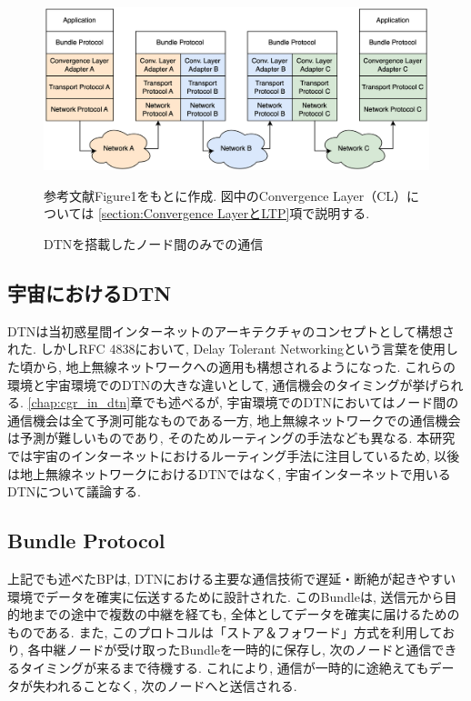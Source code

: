 
\begin{figure}[tbh]
    \centering
    \includegraphics[width=0.7\textheight]{img/dtnprotocolstack.pdf}
    \caption{DTNを搭載したノード間のみでの通信}
    \label{fig:dtnprotocolstack}
    \begin{minipage}{\textwidth}
        \raggedright
        \vspace{3mm}
        \fontsize{10.5pt}{12pt}\selectfont
        参考文献\cite{bundle_protocol_architecture}Figure1をもとに作成. 
        図中のConvergence Layer（CL）については
        \ref{section:Convergence LayerとLTP}項で説明する.
    \end{minipage}
\end{figure}

\subsection{宇宙におけるDTN}
DTNは当初惑星間インターネットのアーキテクチャのコンセプトとして構想された. しかしRFC 4838\cite{rfc4838}において, 
Delay Tolerant Networkingという言葉を使用した頃から, 地上無線ネットワークへの適用も構想されるようになった. 
これらの環境と宇宙環境でのDTNの大きな違いとして, 通信機会のタイミングが挙げられる. 
\ref{chap:cgr_in_dtn}章でも述べるが, 
宇宙環境でのDTNにおいてはノード間の通信機会は全て予測可能なものである一方, 
地上無線ネットワークでの通信機会は予測が難しいものであり, そのためルーティングの手法なども異なる. 
本研究では宇宙のインターネットにおけるルーティング手法に注目しているため, 以後は地上無線ネットワークにおけるDTNではなく, 
宇宙インターネットで用いるDTNについて議論する. 

\subsection{Bundle Protocol}
\label{subsection:Bundle Protocol}
上記でも述べたBPは, DTNにおける主要な通信技術で遅延・断絶が起きやすい環境でデータを確実に伝送するために設計された. 
このBundleは,  送信元から目的地までの途中で複数の中継を経ても, 全体としてデータを確実に届けるためのものである.  
また, このプロトコルは「ストア＆フォワード」方式を利用しており,  各中継ノードが受け取ったBundleを一時的に保存し,  
次のノードと通信できるタイミングが来るまで待機する.  これにより, 通信が一時的に途絶えてもデータが失われることなく,  次のノードへと送信される. 

